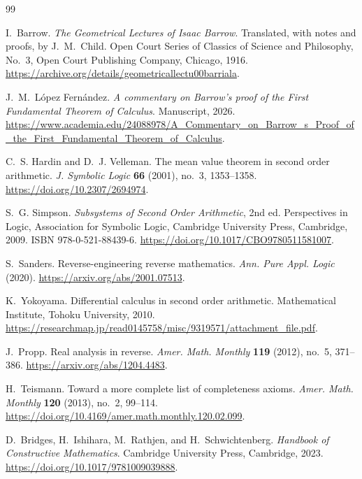 \documentclass[11pt,reqno]{amsart}
\theoremstyle{redplain}
\begin{document}
\begin{thebibliography}{99}
	
	I.~Barrow.
	\newblock \emph{The Geometrical Lectures of Isaac Barrow}.
	\newblock Translated, with notes and proofs, by J.~M.~Child. Open Court
	Series of Classics of Science and Philosophy, No.~3, Open Court
	Publishing Company, Chicago, 1916.
	\newblock \url{https://archive.org/details/geometricallectu00barriala}.
	
	J.~M.~L\'opez Fern\'andez.
	\newblock \emph{A commentary on Barrow's proof of the First Fundamental
		Theorem of Calculus}.
	\newblock Manuscript, 2026.
	\newblock
	\url{https://www.academia.edu/24088978/A_Commentary_on_Barrow_s_Proof_of_the_First_Fundamental_Theorem_of_Calculus}.
	
	 C.~S. Hardin and D.~J. Velleman.
	\newblock The mean value theorem in second order arithmetic.
	\newblock \emph{J. Symbolic Logic} \textbf{66} (2001), no.~3, 1353--1358.
	\newblock \url{https://doi.org/10.2307/2694974}.
	
	 S.~G. Simpson.
	\newblock \emph{Subsystems of Second Order Arithmetic}, 2nd ed.
	\newblock Perspectives in Logic, Association for Symbolic Logic,
	Cambridge University Press, Cambridge, 2009.
	\newblock ISBN 978-0-521-88439-6.
	\newblock \url{https://doi.org/10.1017/CBO9780511581007}.
	
	 S.~Sanders.
	\newblock Reverse-engineering reverse mathematics.
	\newblock \emph{Ann. Pure Appl. Logic} (2020).
	\newblock \url{https://arxiv.org/abs/2001.07513}.
	
	 K.~Yokoyama.
	\newblock Differential calculus in second order arithmetic.
	\newblock Mathematical Institute, Tohoku University, 2010.
	\newblock
	\url{https://researchmap.jp/read0145758/misc/9319571/attachment_file.pdf}.
	
	 J.~Propp.
	\newblock Real analysis in reverse.
	\newblock \emph{Amer. Math. Monthly} \textbf{119} (2012), no.~5, 371--386.
	\newblock \url{https://arxiv.org/abs/1204.4483}.
	
	 H.~Teismann.
	\newblock Toward a more complete list of completeness axioms.
	\newblock \emph{Amer. Math. Monthly} \textbf{120} (2013), no.~2, 99--114.
	\newblock \url{https://doi.org/10.4169/amer.math.monthly.120.02.099}.
	
	 D.~Bridges, H.~Ishihara, M.~Rathjen, and
	H.~Schwichtenberg.
	\newblock \emph{Handbook of Constructive Mathematics}.
	\newblock Cambridge University Press, Cambridge, 2023.
	\newblock \url{https://doi.org/10.1017/9781009039888}.
	

\end{thebibliography}
\end{document}
